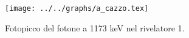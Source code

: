 \begin{figure}[h] \centering\texttt{[image: ../../graphs/a\_cazzo.tex]}\caption{Fotopicco del fotone a 1173 keV nel rivelatore 1.}\label{gr:a_cazzo} \end{figure}
